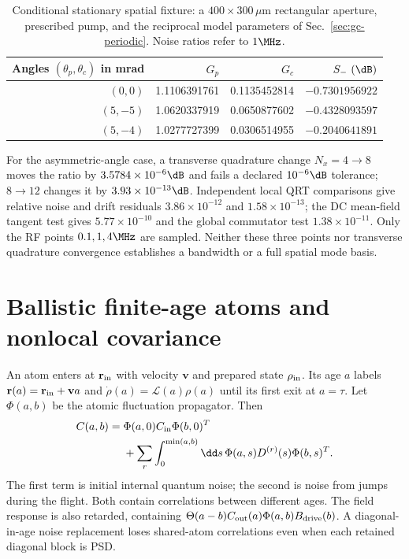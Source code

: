 \begin{table}[ht]
\centering\small
\caption{Conditional stationary spatial fixture: a $400\times300\,\mu\mathrm m$
rectangular aperture, prescribed pump, and the reciprocal model parameters of
Sec.~\ref{sec:gc-periodic}. Noise ratios refer to $1\MHz$.}
\label{tab:gc-spatial}
\begin{tabular}{rrrr}
\toprule
Angles $(\theta_p,\theta_c)$ in mrad&$G_p$&$G_c$&$S_-\ (\dB)$\\
\midrule
$(0,0)$&1.1106391761&0.1135452814&$-0.7301956922$\\
$(5,-5)$&1.0620337919&0.0650877602&$-0.4328093597$\\
$(5,-4)$&1.0277727399&0.0306514955&$-0.2040641891$\\
\bottomrule
\end{tabular}
\end{table}
For the asymmetric-angle case, a transverse quadrature change $N_x=4\to8$
moves the ratio by $3.5784\times10^{-6}\dB$ and fails a declared
$10^{-6}\dB$ tolerance; $8\to12$ changes it by $3.93\times10^{-13}\dB$.
Independent local QRT comparisons give relative noise and drift residuals
$3.86\times10^{-12}$ and $1.58\times10^{-13}$; the DC mean-field tangent
test gives $5.77\times10^{-10}$ and the global commutator test
$1.38\times10^{-11}$. Only the RF points $0.1,1,4\MHz$ are sampled. Neither
these three points nor transverse quadrature convergence establishes a
bandwidth or a full spatial mode basis.

\section{Ballistic finite-age atoms and nonlocal covariance}
\label{sec:gc-transport}

An atom enters at $\mathbf r_{\rm in}$ with velocity $\mathbf v$ and
prepared state $\rho_{\rm in}$. Its age $a$ labels
$\mathbf r(a)=\mathbf r_{\rm in}+\mathbf va$ and
$\dot\rho(a)=\mathcal L(a)\rho(a)$ until its first exit at $a=\tau$.
Let $\Phi(a,b)$ be the atomic fluctuation propagator. Then
\begin{align}
 C(a,b)={}&\Phi(a,0)C_{\rm in}\Phi(b,0)^T\nonumber\\
 &+\sum_r\int_0^{\min(a,b)}\dd s\,
      \Phi(a,s)D^{(r)}(s)\Phi(b,s)^T.
 \label{eq:gc-transport-covariance}
\end{align}
The first term is initial internal quantum noise; the second is noise from
jumps during the flight. Both contain correlations between different ages.
The field response is also retarded, containing
$\Theta(a-b)C_{\rm out}(a)\Phi(a,b)B_{\rm drive}(b)$. A diagonal-in-age
noise replacement loses shared-atom correlations even when each retained
diagonal block is PSD.

